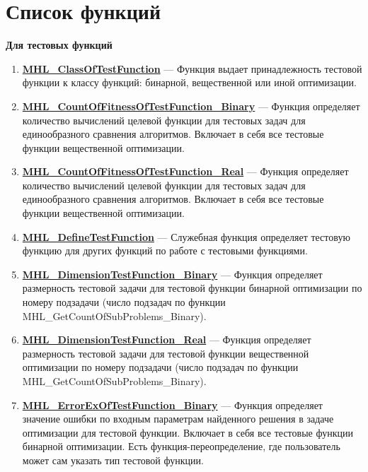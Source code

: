 \documentclass[a4paper,12pt]{article}
\begin{document}
\section{Список функций}\label{section_listfunctions}
\textbf{Для тестовых функций}
\begin{enumerate}

\item \textbf{\hyperref[MHL_ClassOfTestFunction]{MHL\_ClassOfTestFunction}} --- Функция выдает принадлежность тестовой функции к классу функций: бинарной, вещественной или иной оптимизации.

\item \textbf{\hyperref[MHL_CountOfFitnessOfTestFunction_Binary]{MHL\_CountOfFitnessOfTestFunction\_Binary}} --- Функция определяет количество вычислений целевой функции для тестовых задач для единообразного сравнения алгоритмов. Включает в себя все тестовые функции вещественной оптимизации.

\item \textbf{\hyperref[MHL_CountOfFitnessOfTestFunction_Real]{MHL\_CountOfFitnessOfTestFunction\_Real}} --- Функция определяет количество вычислений целевой функции для тестовых задач для единообразного сравнения алгоритмов. Включает в себя все тестовые функции вещественной оптимизации.

\item \textbf{\hyperref[MHL_DefineTestFunction]{MHL\_DefineTestFunction}} --- Служебная функция определяет тестовую функцию для других функций по работе с тестовыми функциями.

\item \textbf{\hyperref[MHL_DimensionTestFunction_Binary]{MHL\_DimensionTestFunction\_Binary}} --- Функция определяет размерность тестовой задачи для тестовой функции бинарной оптимизации по номеру подзадачи (число подзадач по функции MHL\_GetCountOfSubProblems\_Binary).

\item \textbf{\hyperref[MHL_DimensionTestFunction_Real]{MHL\_DimensionTestFunction\_Real}} --- Функция определяет размерность тестовой задачи для тестовой функции вещественной оптимизации по номеру подзадачи (число подзадач по функции MHL\_GetCountOfSubProblems\_Binary).

\item \textbf{\hyperref[MHL_ErrorExOfTestFunction_Binary]{MHL\_ErrorExOfTestFunction\_Binary}} --- Функция определяет значение ошибки по входным параметрам найденного решения в задаче оптимизации для тестовой функции. Включает в себя все тестовые функции бинарной оптимизации. Есть функция-переопределение, где пользователь может сам указать тип тестовой функции.


\end{enumerate}
\end{document}
